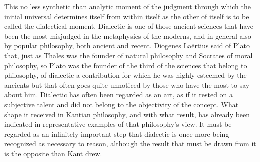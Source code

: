 This no less synthetic than analytic moment of the judgment through
which the initial universal determines itself from within itself as the other
of itself is to be called the dialectical moment. Dialectic is one of those
ancient sciences that have been the most misjudged in the metaphysics of
the moderns, and in general also by popular philosophy, both ancient and
recent. Diogenes Laërtius said of Plato that, just as Thales was the founder
of natural philosophy and Socrates of moral philosophy, so Plato was the
founder of the third of the sciences that belong to philosophy, of dialectic
a contribution for which he was highly esteemed by the ancients but that
often goes quite unnoticed by those who have the most to say about him.
Dialectic has often been regarded as an art, as if it rested on a subjective
talent and did not belong to the objectivity of the concept. What shape
it received in Kantian philosophy, and with what result, has already been
indicated in representative examples of that philosophy's view. It must be
regarded as an infinitely important step that dialectic is once more being
recognized as necessary to reason, although the result that must be drawn
from it is the opposite than Kant drew.

